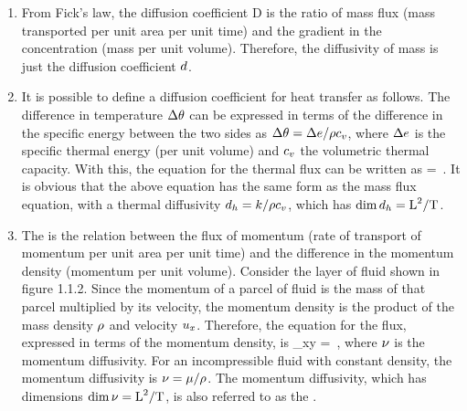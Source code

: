 \begin{enumerate}
\item From Fick's law, the diffusion coefficient D is the ratio of mass flux (mass transported per unit area per unit time) and the gradient in the concentration (mass per unit volume). Therefore, the diffusivity of mass is just the diffusion coefficient $d$.

\item It is possible to define a diffusion coefficient for heat transfer as follows. The difference in temperature $\Delta\theta$ can be expressed in terms of the difference in the specific energy between the two sides as $\Delta\theta = \Delta e/\rho c_v$, where $\Delta e$ is the specific thermal energy (per unit volume) and $c_v$ the volumetric thermal capacity. With this, the equation for the thermal flux can be written as
\beq
\flux\then = \dfrac{\Dx\then}{\length}\,.
\eeq
It is obvious that the above equation has the same form as the mass flux equation, with a thermal diffusivity $d_h = k/\rho c_v$, which has $\dim d_h = \text{L}^2/\text{T}$.

\item The  is the relation between the flux of momentum (rate of transport of momentum per unit area per unit time) and the difference in the momentum density (momentum per unit volume). Consider the layer of fluid shown in figure 1.1.2. Since the momentum of a parcel of fluid is the mass of that parcel multiplied by its velocity, the momentum density is the product of the mass density $\rho$ and velocity $u_x$. Therefore, the equation for the flux, expressed in terms of the momentum density, is
\beq
\shear_{xy} = \kinvis{}\,,
\eeq
where $\nu$ is the momentum diffusivity. For an incompressible fluid with constant density, the momentum diffusivity is $\nu = \mu/\rho$. The momentum diffusivity, which has dimensions $\dim\nu = \text{L}^2/\text{T}$, is also referred to as the .
\end{enumerate}


